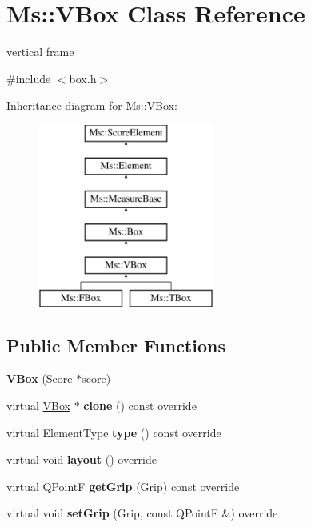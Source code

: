 \hypertarget{class_ms_1_1_v_box}{}\section{Ms\+:\+:V\+Box Class Reference}
\label{class_ms_1_1_v_box}


vertical frame  




{\ttfamily \#include $<$box.\+h$>$}

Inheritance diagram for Ms\+:\+:V\+Box\+:\begin{figure}[H]
\begin{center}
\leavevmode
\includegraphics[height=6.000000cm]{class_ms_1_1_v_box}
\end{center}
\end{figure}
\subsection*{Public Member Functions}
\begin{DoxyCompactItemize}
\item 
\mbox{\label{class_ms_1_1_v_box_afa8db6117d048a7789694b61488625ba}} 
{\bfseries V\+Box} (\hyperlink{class_ms_1_1_score}{Score} $\ast$score)
\item 
\mbox{\label{class_ms_1_1_v_box_a99373099a58e48deb1a48c25de01f101}} 
virtual \hyperlink{class_ms_1_1_v_box}{V\+Box} $\ast$ {\bfseries clone} () const override
\item 
\mbox{\label{class_ms_1_1_v_box_a39c38fe22b7f5f4de9e31dab2f71743e}} 
virtual Element\+Type {\bfseries type} () const override
\item 
\mbox{\label{class_ms_1_1_v_box_aacc1a0be3182380e598483f028f4f461}} 
virtual void {\bfseries layout} () override
\item 
\mbox{\label{class_ms_1_1_v_box_ab4fa58d5c6b42f5c2cd828c4ee6f39ae}} 
virtual Q\+PointF {\bfseries get\+Grip} (Grip) const override
\item 
\mbox{\label{class_ms_1_1_v_box_a1f103b0d5957d5e0fe64631df32ff8ed}} 
virtual void {\bfseries set\+Grip} (Grip, const Q\+PointF \&) override
\end{DoxyCompactItemize}

